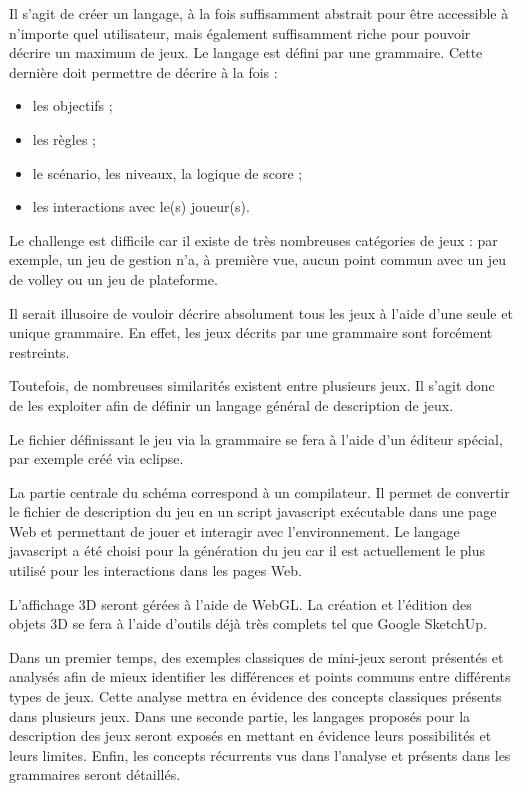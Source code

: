 Il s'agit de créer un langage, à la fois suffisamment abstrait pour être accessible à n'importe quel utilisateur, mais également suffisamment riche
pour pouvoir décrire un maximum de jeux.
Le langage est défini par une grammaire.
Cette dernière doit permettre de décrire à la fois :
\begin{itemize}
 \item les objectifs ;
 \item les règles ;
 \item le scénario, les niveaux, la logique de score ;
 \item les interactions avec le(s) joueur(s).
\end{itemize}

Le challenge est difficile car il existe de très nombreuses catégories de jeux : 
par exemple, un jeu de gestion n'a, à première vue, aucun point commun avec un jeu de volley ou un jeu de plateforme.

Il serait illusoire de vouloir décrire absolument tous les jeux à l'aide d'une seule et unique grammaire.
En effet, les jeux décrits par une grammaire sont forcément restreints.

Toutefois, de nombreuses similarités existent entre plusieurs jeux. Il s'agit donc de les exploiter afin de définir un langage général de description de jeux.

Le fichier définissant le jeu via la grammaire se fera à l'aide d'un éditeur spécial, par exemple créé via eclipse.

\vspace{0.5cm}

La partie centrale du schéma correspond à un compilateur.
Il permet de convertir le fichier de description du jeu en un script javascript exécutable dans une page Web et permettant de jouer et 
interagir avec l'environnement.
Le langage javascript a été choisi pour la génération du jeu car il est actuellement le plus utilisé pour les interactions dans les pages Web.

L'affichage 3D seront gérées à l'aide de WebGL.
La création et l'édition des objets 3D se fera à l'aide d'outils déjà très complets tel que Google SketchUp.

\vspace{0.5cm}

Dans un premier temps, des exemples classiques de mini-jeux seront présentés et analysés afin de mieux identifier
les différences et points communs entre différents types de jeux. Cette analyse mettra en évidence des concepts classiques
présents dans plusieurs jeux.
Dans une seconde partie, les langages proposés pour la description des jeux seront exposés en mettant en évidence leurs possibilités et leurs limites.
Enfin, les concepts récurrents vus dans l'analyse et présents dans les grammaires seront détaillés.